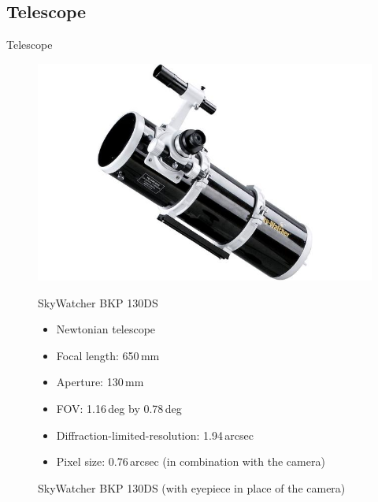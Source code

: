 \documentclass[11pt, aspectratio=169]{beamer}
\begin{document}
\subsection{Telescope} 			%
\begin{frame}{Telescope}
\begin{figure}[!htb]
    \centering
    \begin{minipage}{.5\textwidth}
        \centering
        \includegraphics[width=\linewidth]{figures/images/SkyWatcher_BKP130DS.jpg}
        \caption*{SkyWatcher BKP 130DS (with eyepiece in place of the camera)}
    \end{minipage}%
    \begin{minipage}{0.5\textwidth}
    SkyWatcher BKP 130DS
    \begin{itemize}%
        \item Newtonian telescope 
        \item Focal length: 650\,mm 
        \item Aperture: 130\,mm
        \item FOV: 1.16\,deg by 0.78\,deg 
        \item Diffraction-limited-resolution: 1.94\,arcsec
        \item Pixel size: 0.76\,arcsec (in \newline combination with the camera)
    \end{itemize}
    \end{minipage}
\end{figure}
\end{frame}


\end{document}
